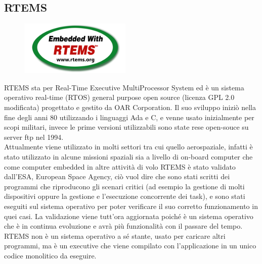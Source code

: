 \documentclass[12pt, a4paper, titlepage, oneside]{book}
\begin{document}
\begin{flushleft}
\section{RTEMS}
\begin{figure}[h]
    \centering
    \includegraphics[scale = 2]{rtemslogo.png}
\end{figure}
RTEMS sta per Real-Time Executive MultiProcessor System ed è un sistema operativo real-time (RTOS) general purpose open source (licenza GPL 2.0 modificata) progettato e gestito da OAR Corporation. Il suo sviluppo iniziò nella fine degli anni 80 utilizzando i linguaggi Ada e C, e venne usato inizialmente per scopi militari, invece le prime versioni utilizzabili sono state rese open-souce su server ftp nel 1994.\\
Attualmente viene utilizzato in molti settori tra cui quello aerospaziale, infatti è stato utilizzato in alcune missioni spaziali sia a livello di on-board computer che come computer embedded in altre attività di volo
RTEMS è  stato validato dall'ESA, European Space Agency, ciò vuol dire che sono stati scritti dei programmi che riproducono gli scenari critici (ad esempio la gestione di molti dispositivi oppure la gestione e l'esecuzione concorrente dei task), e sono stati eseguiti sul sistema operativo per poter verificare il suo corretto funzionamento in quei casi. La validazione viene tutt'ora aggiornata poiché è un sistema operativo che è in continua evoluzione e avrà più funzionalità con il passare del tempo.\\
RTEMS non è un sistema operativo a sé stante, usato per caricare altri programmi, ma è un executive che viene compilato con l'applicazione in un unico codice monolitico da eseguire.


\end{flushleft}
\end{document}
